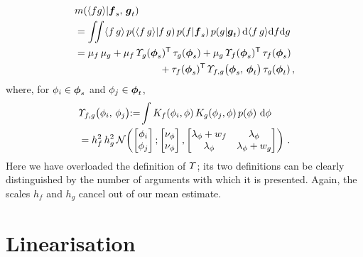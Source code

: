 \documentclass{article}
\begin{document}
\begin{align*} %
& \mean{\inty{f g}}{\vf_{s},\,\vg_{t}} \nonumber\\
& 
=
\iint \inty{f\,g}\,\p{\inty{f\,g}}{{f\,g}}
\p{f}{\vf_s}\p{g}{\vg_t}\ud \inty{f\,g}\ud f\ud g                                                                                                                                                                      \nonumber\\
&
 = 
\mu_f\,\mu_g
+ \mu_f\,\ntT{s}{g}\, \dtt{s}{g}
+ \mu_g\,\ntT{s}{f}\, \dtt{s}{f}
\nonumber\\
&\hspace{3cm}
+ \dtt{{s}}{f}\tra\,\Ot_{f,g}\bigr(\vph_{s},\,\vph_{t}\bigr)\,\dtt{{t}}{g}
\,,
\end{align*}
where, for $\phi_i \in \vph_{s}$ and $\phi_j \in \vph_{t}$,
\begin{align*} %
& \Ot_{f,g}\bigr(\phi_{i},\,\phi_{j}\bigl) 
\deq 
\!\int K_{f}(\phi_i,\phi)\,K_{g}(\phi_j,\phi)\,\po{\phi}\, \ud\phi\nonumber\\
& =h_{f}^2\, h_{g}^2\,
\N{\begin{bmatrix} \phi_i \\ \phi_j \end{bmatrix}}
{\begin{bmatrix} \nu_{\phi}\\ \nu_{\phi}\end{bmatrix}}
{\begin{bmatrix}  
\lambda_\phi+w_{f} & \lambda_\phi \\ 
\lambda_\phi & \lambda_\phi +w_{g}
\end{bmatrix}}\,.
\end{align*}
Here we have overloaded the definition of $\Ot$; its two definitions can be clearly distinguished by the number of arguments with which it is presented. 
Again, the scales $h_f$ and $h_g$ cancel out of our mean estimate.

\section{Linearisation}
\end{document}
